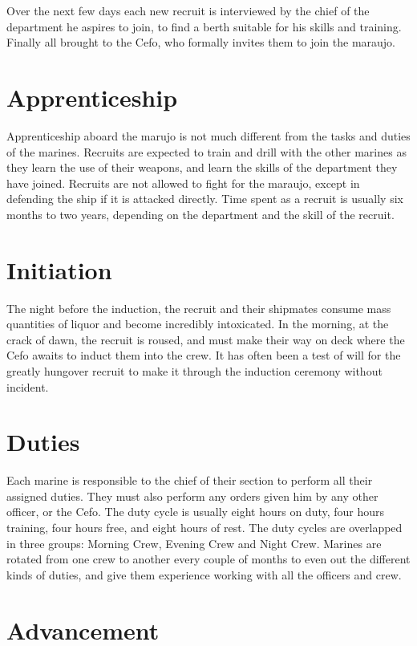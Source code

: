 Over the next few days each new recruit is interviewed by the chief of the department he aspires to join, to find a berth suitable for his skills and training. Finally all brought to the Cefo, who formally invites them to join the maraujo.

\section{Apprenticeship}

Apprenticeship aboard the marujo is not much different from the tasks and duties of the marines. Recruits are expected to train and drill with the other marines as they learn the use of their weapons, and learn the skills of the department they have joined. Recruits are not allowed to fight for the maraujo, except in defending the ship if it is attacked directly. Time spent as a recruit is usually six months to two
years, depending on the department and the skill of the recruit.

\section{Initiation}

The night before the induction, the recruit and their shipmates consume mass quantities of liquor and become incredibly intoxicated. In the morning, at the crack of dawn, the recruit is roused, and must make their way on deck where the Cefo awaits to induct them into the crew. It has often been a test of will for the greatly hungover recruit to make it through the induction ceremony without incident.

\section{Duties}

Each marine is responsible to the chief of their section to perform all their assigned duties. They must also perform any orders given him by any other officer, or the Cefo. The duty cycle is usually eight hours on duty, four hours training, four hours free, and eight hours of rest. The duty cycles are overlapped in three groups: Morning Crew, Evening Crew and Night Crew. Marines are rotated from one crew to another every couple of months to even out the
different kinds of duties, and give them experience working with all the officers and crew.

\section{Advancement}

